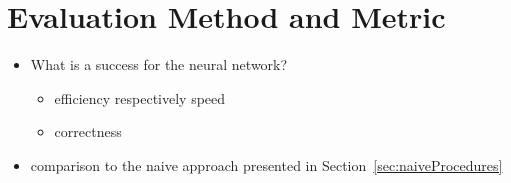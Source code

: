 \documentclass[a4paper]{article}
\begin{document}
\section{Evaluation Method and Metric}
\begin{itemize}
  \item What is a success for the neural network?
        \begin{itemize}[label=\(\rightarrow \)]
          \item efficiency respectively speed
          \item correctness
        \end{itemize}
  \item comparison to the naive approach presented in Section~\ref{sec:naiveProcedures}
\end{itemize}
\end{document}
